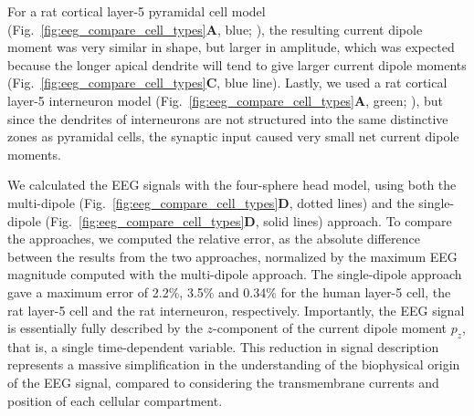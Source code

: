 \documentclass[preprint,10pt,authoryear]{elsarticle}
\newcommand{\hlb}[2][NavyBlue]{ {\sethlcolor{#1} \hl{#2}} }
\newcommand{\hlp}[2][Purple]{ {\sethlcolor{#1} \hl{#2}} }
\newcommand{\snnote}[1]{\color{white}{\hlb{SN: #1 }}\color{black}}
\newcommand{\sntxt}[1]{{\color{NavyBlue}#1}}
\newcommand{\tvntxt}[1]{{\color{Emerald}#1}}
\newcommand{\gen}[1]{\color{white}{\hlp{GTE: #1 }}\color{black}}
\begin{document}
For a rat cortical layer-5 pyramidal cell model (Fig.~\ref{fig:eeg_compare_cell_types}\textbf{A}, blue; \cite{HAY2011}), the resulting current dipole moment was very similar in shape, but larger in amplitude, which was expected because the longer apical dendrite will tend to give larger current dipole moments (Fig.~\ref{fig:eeg_compare_cell_types}\textbf{C}, blue line).
Lastly, we used a rat cortical layer-5 interneuron model (Fig.~\ref{fig:eeg_compare_cell_types}\textbf{A}, green; \cite{MARKRAM2015}), but since the dendrites of interneurons are not structured into the same distinctive zones as pyramidal cells, the synaptic input caused very small net current dipole moments.

We calculated the EEG signals with the four-sphere head model, using both the multi-dipole (Fig.~\ref{fig:eeg_compare_cell_types}\textbf{D}, dotted lines) and the single-dipole (Fig.~\ref{fig:eeg_compare_cell_types}\textbf{D}, solid lines) approach.
\tvntxt{To compare the approaches, we computed the relative error, as the absolute difference between the results from the two approaches, normalized by the maximum EEG magnitude computed with the multi-dipole approach.}
The single-dipole approach gave a maximum 
error of  2.2$\%$, 3.5$\%$ and 0.34$\%$ for the human layer-5 cell, the rat layer-5 cell and the rat interneuron, respectively.
Importantly, the EEG signal is essentially fully described by the $z$-component of the current dipole moment $p_z$, that is, a single time-dependent variable. This reduction in signal description represents a massive simplification in the understanding of the biophysical origin of the EEG signal, compared to considering the transmembrane currents and position of each cellular compartment. 
\end{document}
